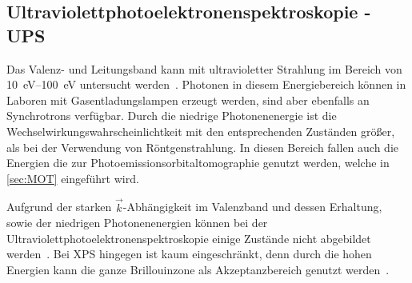         

        \subsection{Ultraviolettphotoelektronenspektroskopie - UPS} \label{sec:UPS}
            Das Valenz- und Leitungsband kann mit ultravioletter Strahlung im Bereich von \SIrange{10}{100}{\electronvolt} untersucht werden~\cite{Fauster}.
            Photonen in diesem Energiebereich können in Laboren mit Gasentladungslampen erzeugt werden, sind aber ebenfalls an Synchrotrons verfügbar.
            Durch die niedrige Photonenenergie ist die Wechselwirkungswahrscheinlichtkeit mit den entsprechenden Zuständen größer, als bei der Verwendung von Röntgenstrahlung.
            In diesen Bereich fallen auch die Energien die zur Photoemissionsorbitaltomographie genutzt werden, welche in \autoref{sec:MOT} eingeführt wird.

            Aufgrund der starken $\vec{k}$-Abhängigkeit im Valenzband und dessen Erhaltung, sowie der niedrigen Photonenenergien können bei der Ultraviolettphotoelektronenspektroskopie einige Zustände nicht abgebildet werden~\cite{Hüfner}.
            Bei XPS hingegen ist kaum eingeschränkt, denn durch die hohen Energien kann die ganze Brillouinzone als Akzeptanzbereich genutzt werden~\cite{Hüfner}.

